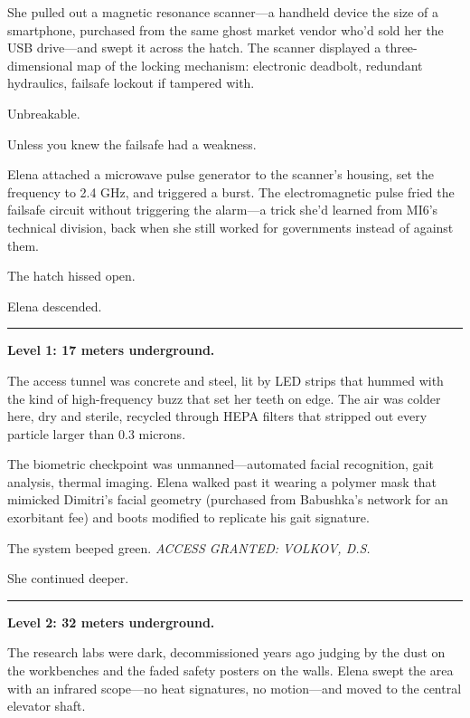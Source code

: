 \documentclass[12pt,letterpaper]{book}
\begin{document}
She pulled out a magnetic resonance scanner---a handheld device the size of a smartphone, purchased from the same ghost market vendor who'd sold her the USB drive---and swept it across the hatch. The scanner displayed a three-dimensional map of the locking mechanism: electronic deadbolt, redundant hydraulics, failsafe lockout if tampered with.

Unbreakable.

Unless you knew the failsafe had a weakness.

Elena attached a microwave pulse generator to the scanner's housing, set the frequency to 2.4 GHz, and triggered a burst. The electromagnetic pulse fried the failsafe circuit without triggering the alarm---a trick she'd learned from MI6's technical division, back when she still worked for governments instead of against them.

The hatch hissed open.

Elena descended.

\begin{center}\rule{0.5\linewidth}{0.5pt}\end{center}

\textbf{Level 1: 17 meters underground.}

The access tunnel was concrete and steel, lit by LED strips that hummed with the kind of high-frequency buzz that set her teeth on edge. The air was colder here, dry and sterile, recycled through HEPA filters that stripped out every particle larger than 0.3 microns.

The biometric checkpoint was unmanned---automated facial recognition, gait analysis, thermal imaging. Elena walked past it wearing a polymer mask that mimicked Dimitri's facial geometry (purchased from Babushka's network for an exorbitant fee) and boots modified to replicate his gait signature.

The system beeped green. \emph{ACCESS GRANTED: VOLKOV, D.S.}

She continued deeper.

\begin{center}\rule{0.5\linewidth}{0.5pt}\end{center}

\textbf{Level 2: 32 meters underground.}

The research labs were dark, decommissioned years ago judging by the dust on the workbenches and the faded safety posters on the walls. Elena swept the area with an infrared scope---no heat signatures, no motion---and moved to the central elevator shaft.
\end{document}
